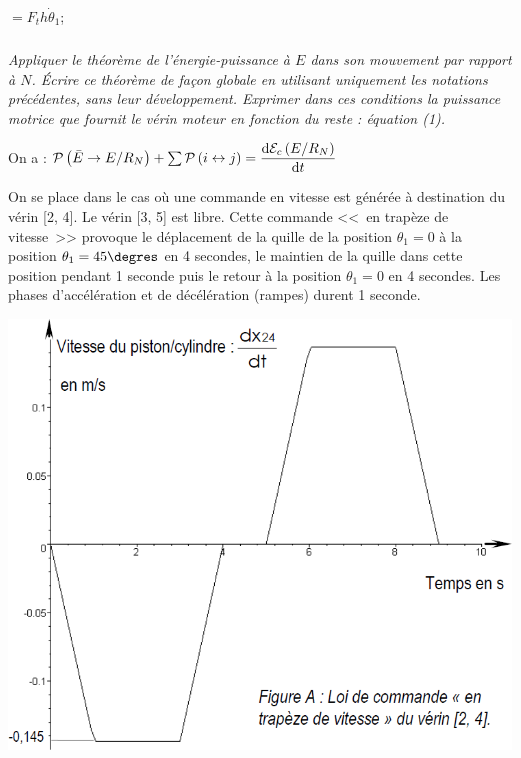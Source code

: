\documentclass[10pt,fleqn]{article} %
\newif\iftdifficile
\begin{document}
\begin{multicols}{2}
\begin{corrige}
\begin{itemize}
$=F_t h \dot{\theta}_1$;

\end{itemize}
\end{corrige}
\else
\fi

\subparagraph{}\textit{Appliquer le théorème de l’énergie-puissance à $E$ dans son mouvement par rapport à $N$. Écrire ce
théorème de façon globale en utilisant uniquement les notations précédentes, sans leur
développement. Exprimer dans ces conditions la puissance motrice que fournit le vérin moteur en
fonction du reste : équation (1).}
\ifprof
\begin{corrige}
On a :
$\mathcal{P}\left(\bar{E}\rightarrow E/R_N\right) + \sum \mathcal{P}\left(i \stackrel{\text{}}{\leftrightarrow} j\right)=\dfrac{\text{d} \mathcal{E}_c\left(E/R_N\right)}{\text{d} t}$
\end{corrige}
\else
\fi

\else
\fi


\iftdifficile

\subparagraph{}\textit{ Exprimer la puissance motrice que fournit le vérin moteur en
fonction des données du problème. La méthode sera précisément décrite. Chacun des termes seront calculés. Il n'est pas demandé d'écrire la relation finale.}
\else
\fi

\ifprof
\else


On se place dans le cas où une commande en vitesse est générée à destination du vérin [2, 4]. Le vérin [3, 5]
est libre. Cette commande <<~en trapèze de vitesse~>>  provoque le déplacement de la quille de la position $\theta_1=0$
 à la position $\theta_1 = 45\degres$ en 4 secondes, le maintien de la quille dans cette position pendant 1 seconde puis le
 retour à la position $\theta_1=0$ en 4 secondes. Les phases d’accélération et de décélération (rampes) durent 1 seconde.


\begin{center}
\includegraphics[width=.6\linewidth]{images/fig_06}
\end{center}


\end{multicols}
\end{document}
